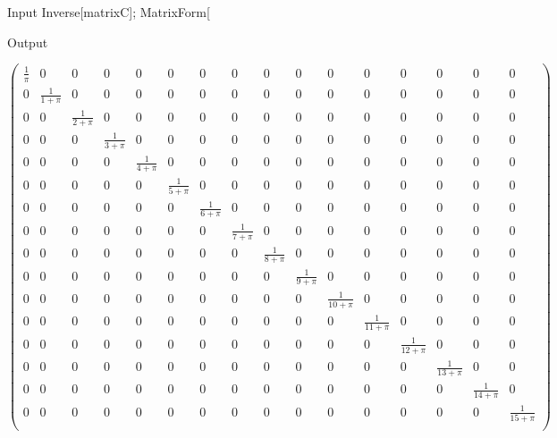 \documentclass[11pt,a4paper]{article}
\begin{document}
\begin{mmaCell}[moredefined={matrixC}]{Input}
Inverse[matrixC];
MatrixForm[%
\end{mmaCell}

\begin{mmaCell}{Output}

\end{mmaCell}

\begin{doublespace}
\noindent\(\left(
\begin{array}{cccccccccccccccc}
 \frac{1}{\pi } & 0 & 0 & 0 & 0 & 0 & 0 & 0 & 0 & 0 & 0 & 0 & 0 & 0 & 0 & 0 \\
 0 & \frac{1}{1+\pi } & 0 & 0 & 0 & 0 & 0 & 0 & 0 & 0 & 0 & 0 & 0 & 0 & 0 & 0 \\
 0 & 0 & \frac{1}{2+\pi } & 0 & 0 & 0 & 0 & 0 & 0 & 0 & 0 & 0 & 0 & 0 & 0 & 0 \\
 0 & 0 & 0 & \frac{1}{3+\pi } & 0 & 0 & 0 & 0 & 0 & 0 & 0 & 0 & 0 & 0 & 0 & 0 \\
 0 & 0 & 0 & 0 & \frac{1}{4+\pi } & 0 & 0 & 0 & 0 & 0 & 0 & 0 & 0 & 0 & 0 & 0 \\
 0 & 0 & 0 & 0 & 0 & \frac{1}{5+\pi } & 0 & 0 & 0 & 0 & 0 & 0 & 0 & 0 & 0 & 0 \\
 0 & 0 & 0 & 0 & 0 & 0 & \frac{1}{6+\pi } & 0 & 0 & 0 & 0 & 0 & 0 & 0 & 0 & 0 \\
 0 & 0 & 0 & 0 & 0 & 0 & 0 & \frac{1}{7+\pi } & 0 & 0 & 0 & 0 & 0 & 0 & 0 & 0 \\
 0 & 0 & 0 & 0 & 0 & 0 & 0 & 0 & \frac{1}{8+\pi } & 0 & 0 & 0 & 0 & 0 & 0 & 0 \\
 0 & 0 & 0 & 0 & 0 & 0 & 0 & 0 & 0 & \frac{1}{9+\pi } & 0 & 0 & 0 & 0 & 0 & 0 \\
 0 & 0 & 0 & 0 & 0 & 0 & 0 & 0 & 0 & 0 & \frac{1}{10+\pi } & 0 & 0 & 0 & 0 & 0 \\
 0 & 0 & 0 & 0 & 0 & 0 & 0 & 0 & 0 & 0 & 0 & \frac{1}{11+\pi } & 0 & 0 & 0 & 0 \\
 0 & 0 & 0 & 0 & 0 & 0 & 0 & 0 & 0 & 0 & 0 & 0 & \frac{1}{12+\pi } & 0 & 0 & 0 \\
 0 & 0 & 0 & 0 & 0 & 0 & 0 & 0 & 0 & 0 & 0 & 0 & 0 & \frac{1}{13+\pi } & 0 & 0 \\
 0 & 0 & 0 & 0 & 0 & 0 & 0 & 0 & 0 & 0 & 0 & 0 & 0 & 0 & \frac{1}{14+\pi } & 0 \\
 0 & 0 & 0 & 0 & 0 & 0 & 0 & 0 & 0 & 0 & 0 & 0 & 0 & 0 & 0 & \frac{1}{15+\pi } \\
\end{array}
\right)\)
\end{doublespace}
\end{document}
